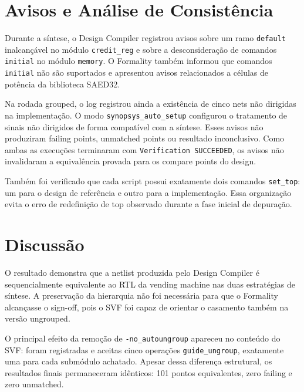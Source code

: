 \documentclass[11pt,a4paper]{article}
\begin{document}
\section{Avisos e Análise de Consistência}

Durante a síntese, o Design Compiler registrou avisos sobre um ramo \texttt{default} inalcançável no módulo \texttt{credit\_reg} e sobre a desconsideração de comandos \texttt{initial} no módulo \texttt{memory}. O Formality também informou que comandos \texttt{initial} não são suportados e apresentou avisos relacionados a células de potência da biblioteca SAED32.

Na rodada grouped, o log registrou ainda a existência de cinco nets não dirigidas na implementação. O modo \texttt{synopsys\_auto\_setup} configurou o tratamento de sinais não dirigidos de forma compatível com a síntese. Esses avisos não produziram failing points, unmatched points ou resultado inconclusivo. Como ambas as execuções terminaram com \texttt{Verification SUCCEEDED}, os avisos não invalidaram a equivalência provada para os compare points do design.

Também foi verificado que cada script possui exatamente dois comandos \texttt{set\_top}: um para o design de referência e outro para a implementação. Essa organização evita o erro de redefinição de top observado durante a fase inicial de depuração.

\section{Discussão}

O resultado demonstra que a netlist produzida pelo Design Compiler é sequencialmente equivalente ao RTL da vending machine nas duas estratégias de síntese. A preservação da hierarquia não foi necessária para que o Formality alcançasse o sign-off, pois o SVF foi capaz de orientar o casamento também na versão ungrouped.

O principal efeito da remoção de \texttt{-no\_autoungroup} apareceu no conteúdo do SVF: foram registradas e aceitas cinco operações \texttt{guide\_ungroup}, exatamente uma para cada submódulo achatado. Apesar dessa diferença estrutural, os resultados finais permaneceram idênticos: 101 pontos equivalentes, zero failing e zero unmatched.
\end{document}
